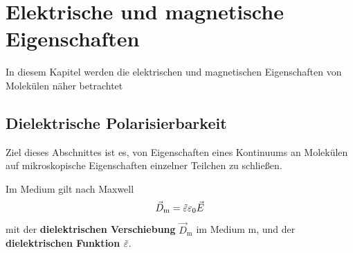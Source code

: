 \section{Elektrische und magnetische Eigenschaften}
\begin{verbal}
    In diesem Kapitel werden die elektrischen und magnetischen Eigenschaften von Molekülen näher betrachtet
\end{verbal}
\subsection{Dielektrische Polarisierbarkeit}
    Ziel dieses Abschnittes ist es, von Eigenschaften eines Kontinuums an Molekülen auf mikroskopische Eigenschaften einzelner Teilchen zu schließen.\par

    Im Medium gilt nach Maxwell
    \begin{equation}
        \vec{D}_\text{m} = \tilde{ \varepsilon }\varepsilon_0\vec{E}
    \end{equation}
    mit der \textbf{dielektrischen Verschiebung} ${\vec{D}_\text{m}}$ im Medium m, und der \textbf{dielektrischen Funktion} ${\tilde{\varepsilon}}$. \\
    
